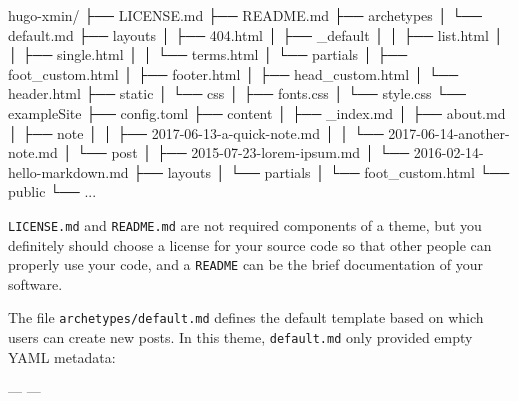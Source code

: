 \documentclass[12pt,]{krantz}
\makeatletter
\newenvironment{Shaded}{\begin{snugshade}}{\end{snugshade}}
\newcommand{\OtherTok}[1]{\textcolor[rgb]{0.56,0.35,0.01}{#1}}
\newcommand{\ExtensionTok}[1]{#1}
\newcommand{\NormalTok}[1]{#1}
\newenvironment{kframe}{%
\medskip{}
\setlength{\fboxsep}{.8em}
 \def\at@end@of@kframe{}%
 \ifinner\ifhmode%
  \def\at@end@of@kframe{\end{minipage}}%
  \begin{minipage}{\columnwidth}%
 \fi\fi%
 \def\FrameCommand##1{\hskip\@totalleftmargin \hskip-\fboxsep
 \colorbox{shadecolor}{##1}\hskip-\fboxsep
     \hskip-\linewidth \hskip-\@totalleftmargin \hskip\columnwidth}%
 \MakeFramed {\advance\hsize-\width
   \@totalleftmargin\z@ \linewidth\hsize
   \@setminipage}}%
 {\par\unskip\endMakeFramed%
 \at@end@of@kframe}
\renewenvironment{Shaded}{\begin{kframe}}{\end{kframe}}
\theoremstyle{definition}
\theoremstyle{definition}
\theoremstyle{definition}
\theoremstyle{remark}
\makeatother
\begin{document}
\begin{Shaded}
\begin{Highlighting}[]
\ExtensionTok{hugo-xmin/}
\NormalTok{├── }\ExtensionTok{LICENSE.md}
\NormalTok{├── }\ExtensionTok{README.md}
\NormalTok{├── }\ExtensionTok{archetypes}
\NormalTok{│   └── }\ExtensionTok{default.md}
\NormalTok{├── }\ExtensionTok{layouts}
\NormalTok{│   ├── }\ExtensionTok{404.html}
\NormalTok{│   ├── }\ExtensionTok{_default}
\NormalTok{│   │   ├── }\ExtensionTok{list.html}
\NormalTok{│   │   ├── }\ExtensionTok{single.html}
\NormalTok{│   │   └── }\ExtensionTok{terms.html}
\NormalTok{│   └── }\ExtensionTok{partials}
\NormalTok{│       ├── }\ExtensionTok{foot_custom.html}
\NormalTok{│       ├── }\ExtensionTok{footer.html}
\NormalTok{│       ├── }\ExtensionTok{head_custom.html}
\NormalTok{│       └── }\ExtensionTok{header.html}
\NormalTok{├── }\ExtensionTok{static}
\NormalTok{│   └── }\ExtensionTok{css}
\NormalTok{│       ├── }\ExtensionTok{fonts.css}
\NormalTok{│       └── }\ExtensionTok{style.css}
\NormalTok{└── }\ExtensionTok{exampleSite}
\NormalTok{    ├── }\ExtensionTok{config.toml}
\NormalTok{    ├── }\ExtensionTok{content}
\NormalTok{    │   ├── }\ExtensionTok{_index.md}
\NormalTok{    │   ├── }\ExtensionTok{about.md}
\NormalTok{    │   ├── }\ExtensionTok{note}
\NormalTok{    │   │   ├── }\ExtensionTok{2017-06-13-a-quick-note.md}
\NormalTok{    │   │   └── }\ExtensionTok{2017-06-14-another-note.md}
\NormalTok{    │   └── }\ExtensionTok{post}
\NormalTok{    │       ├── }\ExtensionTok{2015-07-23-lorem-ipsum.md}
\NormalTok{    │       └── }\ExtensionTok{2016-02-14-hello-markdown.md}
\NormalTok{    ├── }\ExtensionTok{layouts}
\NormalTok{    │   └── }\ExtensionTok{partials}
\NormalTok{    │       └── }\ExtensionTok{foot_custom.html}
\NormalTok{    └── }\ExtensionTok{public}
\NormalTok{        └── }\ExtensionTok{...}
\end{Highlighting}
\end{Shaded}

\texttt{LICENSE.md} and \texttt{README.md} are not required components
of a theme, but you definitely should choose a license for your source
code so that other people can properly use your code, and a
\texttt{README} can be the brief documentation of your software.

The file \texttt{archetypes/default.md} defines the default template
based on which users can create new posts. In this theme,
\texttt{default.md} only provided empty YAML metadata:

\begin{Shaded}
\begin{Highlighting}[]
\OtherTok{---}
\OtherTok{---}
\end{Highlighting}
\end{Shaded}
\end{document}
